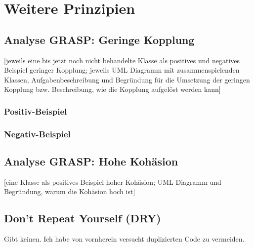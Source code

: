 \chapter{Weitere Prinzipien}

\section{Analyse GRASP: Geringe Kopplung}
[jeweils eine bis jetzt noch nicht behandelte Klasse als positives und negatives Beispiel geringer Kopplung; jeweils UML Diagramm mit zusammenspielenden Klassen, Aufgabenbeschreibung und Begründung für die Umsetzung der geringen Kopplung bzw. Beschreibung, wie die Kopplung aufgelöst werden kann]
\subsection{Positiv-Beispiel}
\subsection{Negativ-Beispiel}

\section{Analyse GRASP: Hohe Kohäsion}
[eine Klasse als positives Beispiel hoher Kohäsion; UML Diagramm und Begründung, warum die Kohäsion hoch ist]

\section{Don't Repeat Yourself (DRY)}
Gibt keinen. Ich habe von vornherein versucht duplizierten Code zu vermeiden.
